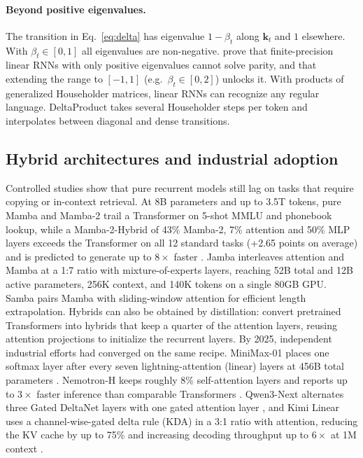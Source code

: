 \documentclass[a4paper]{article}
\newcommand{\vk}{\mathbf{k}}
\theoremstyle{plain}
\theoremstyle{remark}
\begin{document}
\paragraph{Beyond positive eigenvalues.} The transition in Eq.~\eqref{eq:delta} has eigenvalue $1-\beta_t$ along $\vk_t$ and $1$ elsewhere. With $\beta_t\in[0,1]$ all eigenvalues are non-negative. \citet{grazzi2025negative} prove that finite-precision linear RNNs with only positive eigenvalues cannot solve parity, and that extending the range to $[-1,1]$ (e.g.\ $\beta_t\in[0,2]$) unlocks it. With products of generalized Householder matrices, linear RNNs can recognize any regular language. DeltaProduct \citep{siems2025deltaproduct} takes several Householder steps per token and interpolates between diagonal and dense transitions.

\subsection{Hybrid architectures and industrial adoption}
\label{sec:hybrid}
Controlled studies show that pure recurrent models still lag on tasks that require copying or in-context retrieval. At 8B parameters and up to 3.5T tokens, pure Mamba and Mamba-2 trail a Transformer on 5-shot MMLU and phonebook lookup, while a Mamba-2-Hybrid of 43\% Mamba-2, 7\% attention and 50\% MLP layers exceeds the Transformer on all 12 standard tasks (+2.65 points on average) and is predicted to generate up to $8\times$ faster \citep{waleffe2024empirical}. Jamba \citep{lieber2024jamba} interleaves attention and Mamba at a 1:7 ratio with mixture-of-experts layers, reaching 52B total and 12B active parameters, 256K context, and 140K tokens on a single 80GB GPU. Samba \citep{ren2025samba} pairs Mamba with sliding-window attention for efficient length extrapolation. Hybrids can also be obtained by distillation: \citet{wang2024mambainllama} convert pretrained Transformers into hybrids that keep a quarter of the attention layers, reusing attention projections to initialize the recurrent layers. By 2025, independent industrial efforts had converged on the same recipe. MiniMax-01 places one softmax layer after every seven lightning-attention (linear) layers at 456B total parameters \citep{minimax2025}. Nemotron-H keeps roughly 8\% self-attention layers and reports up to $3\times$ faster inference than comparable Transformers \citep{nvidia2025nemotronh}. Qwen3-Next alternates three Gated DeltaNet layers with one gated attention layer \citep{qwen3next}, and Kimi Linear uses a channel-wise-gated delta rule (KDA) in a 3:1 ratio with attention, reducing the KV cache by up to 75\% and increasing decoding throughput up to $6\times$ at 1M context \citep{kimi2025linear}.
\end{document}

